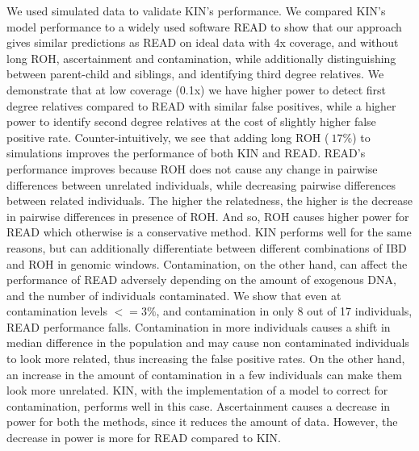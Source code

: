 \documentclass[12pt, letterpaper]{article}
\begin{document}
We used simulated data to validate KIN's performance. We compared KIN's model performance to a widely used software READ to show that our approach gives similar predictions as READ on ideal data with 4x coverage, and without long ROH, ascertainment and contamination, while additionally distinguishing between parent-child and siblings, and identifying third degree relatives. We demonstrate that at low coverage (0.1x) we have higher power to detect first degree relatives compared to READ with similar false positives, while a higher power to identify second degree relatives at the cost of slightly higher false positive rate.
Counter-intuitively, we see that adding long ROH ($~17\%$) to simulations improves the performance of both KIN and READ. READ's performance improves because ROH does not cause any change in pairwise differences between unrelated individuals, while decreasing pairwise differences between related individuals. The higher the relatedness, the higher is the decrease in pairwise differences in presence of ROH. And so, ROH causes higher power for READ which otherwise is a conservative method. KIN performs well for the same reasons, but can additionally differentiate between different combinations of IBD and ROH in genomic windows. Contamination, on the other hand, can affect the performance of READ adversely depending on the amount of exogenous DNA, and the number of individuals contaminated. We show that even at contamination levels  $<=3\%$, and contamination in only 8 out of 17 individuals, READ performance falls. Contamination in more individuals causes a shift in median difference in the population and may cause non contaminated individuals to look more related, thus increasing the false positive rates. On the other hand, an increase in the amount of contamination in a few individuals can make them look more unrelated. KIN, with the implementation of a model to correct for contamination, performs well in this case. Ascertainment causes a decrease in power for both the methods, since it reduces the amount of data. However, the decrease in power is more for READ compared to KIN.
\end{document}
